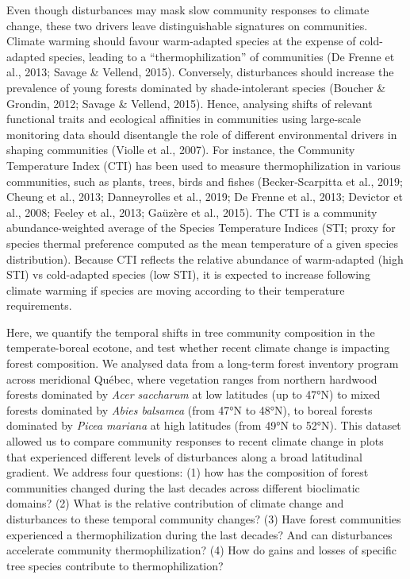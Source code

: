 \documentclass[
  a4paperpaper,
]{article}
\begin{document}
Even though disturbances may mask slow community responses to climate
change, these two drivers leave distinguishable signatures on
communities. Climate warming should favour warm-adapted species at the
expense of cold-adapted species, leading to a ``thermophilization'' of
communities (De Frenne et al., 2013; Savage \& Vellend, 2015).
Conversely, disturbances should increase the prevalence of young forests
dominated by shade-intolerant species (Boucher \& Grondin, 2012; Savage
\& Vellend, 2015). Hence, analysing shifts of relevant functional traits
and ecological affinities in communities using large-scale monitoring
data should disentangle the role of different environmental drivers in
shaping communities (Violle et al., 2007). For instance, the Community
Temperature Index (CTI) has been used to measure thermophilization in
various communities, such as plants, trees, birds and fishes
(Becker‐Scarpitta et al., 2019; Cheung et al., 2013; Danneyrolles et
al., 2019; De Frenne et al., 2013; Devictor et al., 2008; Feeley et al.,
2013; Gaüzère et al., 2015). The CTI is a community abundance-weighted
average of the Species Temperature Indices (STI; proxy for species
thermal preference computed as the mean temperature of a given species
distribution). Because CTI reflects the relative abundance of
warm-adapted (high STI) vs cold-adapted species (low STI), it is
expected to increase following climate warming if species are moving
according to their temperature requirements.

Here, we quantify the temporal shifts in tree community composition in
the temperate-boreal ecotone, and test whether recent climate change is
impacting forest composition. We analysed data from a long-term forest
inventory program across meridional Québec, where vegetation ranges from
northern hardwood forests dominated by \emph{Acer saccharum} at low
latitudes (up to 47°N) to mixed forests dominated by \emph{Abies
balsamea} (from 47°N to 48°N), to boreal forests dominated by
\emph{Picea mariana} at high latitudes (from 49°N to 52°N). This dataset
allowed us to compare community responses to recent climate change in
plots that experienced different levels of disturbances along a broad
latitudinal gradient. We address four questions: (1) how has the
composition of forest communities changed during the last decades across
different bioclimatic domains? (2) What is the relative contribution of
climate change and disturbances to these temporal community changes? (3)
Have forest communities experienced a thermophilization during the last
decades? And can disturbances accelerate community thermophilization?
(4) How do gains and losses of specific tree species contribute to
thermophilization?
\end{document}

